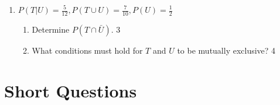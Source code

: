 \documentclass[a4paper,oneside, margin=1.4in]{book}
\begin{document}
\begin{enumerate}
\item \textbf{\( P(T \vert U) = \frac{5}{12}, P(T \cup U) = \frac{7}{10}, P(U) = \frac{1}{2} \)}

\begin{enumerate}
    \item Determine \( P(T \cap \bar{U}) \). \hfill 3
    \item What conditions must hold for \( T \) and \( U \) to be mutually exclusive? \hfill 4
\end{enumerate}



  \end{enumerate}

\section{Short Questions}
\end{document}
